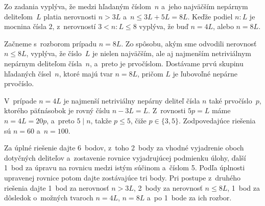 {\ineriesenie
Zo zadania vyplýva, že medzi hľadaným číslom~$n$ a~jeho najväčším
nepárnym deliteľom~$L$ platia nerovnosti $n>3L$ a~$n\le3L+5L=8L$.
Keďže podiel $n:L$ je mocnina čísla $2$, z~nerovností
$3<n:L\le8$ vyplýva, že buď $n=4L$, alebo $n=8L$.

Začneme s~rozborom prípadu $n=8L$. Zo spôsobu, akým sme
odvodili nerovnosť $n\le8L$, vyplýva, že číslo~$L$ je nielen najväčším, ale
aj najmenším netriviálnym nepárnym deliteľom čísla~$n$, a~preto je
prvočíslom. Dostávame prvú skupinu hľadaných čísel~$n$, ktoré majú
tvar $n=8L$, pričom $L$ je ľubovoľné nepárne prvočíslo.

V~prípade $n=4L$ je najmenší netriviálny nepárny deliteľ čísla $n$
také prvočíslo~$p$, ktorého päťnásobok je rovný číslu
$n-3L=L$. Z~rovnosti $5p=L$ máme $n=4L=20p$, a~preto $5\mid n$, takže $p\le5$, čiže $p\in\{3,5\}$. Zodpovedajúce riešenia sú $n=60$
a~$n=100$.


\nobreak\medskip\petit\noindent
Za úplné riešenie dajte 6~bodov, z~toho 2~body za vhodné vyjadrenie
oboch dotyčných deliteľov a~zostavenie rovnice vyjadrujúcej podmienku
úlohy, ďalší 1~bod za úpravu na rovnicu medzi istým
súčinom a~číslom 5. Podľa úplnosti upravenej rovnice
potom dajte zostávajúce tri body. Pri postupe z~druhého riešenia dajte
1~bod za nerovnosť $n>3L$, 2~body za nerovnosť
$n\le 8L$, 1~bod za dôsledok o~možných tvaroch $n=4L$, $n=8L$
a~po 1~bode za ich rozbor.

\endpetit
\bigbreak
}

